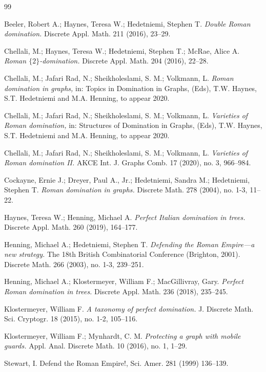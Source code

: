 \documentclass[12pt]{amsart}
\begin{document}
\begin{thebibliography}{99}

 {\sc Beeler, Robert A.; Haynes, Teresa W.; Hedetniemi, Stephen T.} {\it Double Roman 
domination.} Discrete Appl. Math. 211 (2016), 23--29.

 {\sc Chellali, M.; Haynes, Teresa W.; Hedetniemi, Stephen T.; McRae, Alice A.} {\it Roman $\{2\}$-domination.} Discrete Appl. Math. 204 (2016), 22--28.

 {\sc Chellali, M.; Jafari Rad, N.; Sheikholeslami, S. M.; Volkmann, L.} {\it Roman domination in graphs,} in: Topics in Domination in Graphs, (Eds), T.W. Haynes, S.T. Hedetniemi and M.A. Henning, to appear 2020.

 {\sc Chellali, M.; Jafari Rad, N.; Sheikholeslami, S. M.; Volkmann, L.} {\it Varieties of Roman domination,} in: Structures of Domination in Graphs, (Eds), T.W. Haynes, S.T. Hedetniemi and M.A. Henning, to appear 2020.


 {\sc Chellali, M.; Jafari Rad, N.; Sheikholeslami, S. M.; Volkmann, L.} {\it Varieties of Roman domination 
II.} AKCE Int. J. Graphs Comb. 17 (2020), no. 3, 966--984. 

 {\sc Cockayne, Ernie J.; Dreyer, Paul A., Jr.; Hedetniemi, Sandra M.; Hedetniemi, Stephen 
T.} {\it Roman domination in graphs.} Discrete Math. 278 (2004), no. 1-3, 11--22.

 {\sc Haynes, Teresa W.; Henning, Michael A.} {\it Perfect Italian domination in trees.} Discrete Appl. 
Math. 260 (2019), 164--177.

 {\sc Henning, Michael A.; Hedetniemi, Stephen T.} {\it Defending the Roman Empire—a new strategy.} 
The 18th British Combinatorial Conference (Brighton, 2001). Discrete Math. 266 (2003), 
no. 1-3, 239--251.

 {\sc Henning, Michael A.; Klostermeyer, William F.; MacGillivray, Gary.} {\it Perfect Roman domination 
in trees.} Discrete Appl. Math. 236 (2018), 235--245.

 {\sc Klostermeyer, William F.} {\it A taxonomy of perfect domination.} J. Discrete Math. Sci. 
Cryptogr. 18 (2015), no. 1-2, 105--116. 

 {\sc Klostermeyer, William F.; Mynhardt, C. M.} {\it Protecting a graph with mobile guards.} Appl. Anal. 
Discrete Math. 10 (2016), no. 1, 1--29.

 {\sc Stewart, I.} {Defend the Roman Empire!}, Sci. Amer. 281 (1999) 136--139.







\end{thebibliography}
\end{document}
